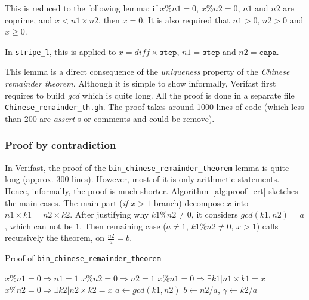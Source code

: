 \documentclass[oneside]{article}
\begin{document}
This is reduced to the following lemma: if $x\%n1 = 0$, $x\%n2 = 0$, $n1$ and $n2$ are coprime, and $x < n1 \times n2$, then $x = 0$. It is also required that $n1 > 0$, $n2 > 0$ and $x \geq 0$.

In \texttt{stripe\_l}, this is applied to $x = diff\times \mathtt{step}$, $n1 = \mathtt{step}$ and $n2 = \mathtt{capa}$.

This lemma is a direct consequence of the \emph{uniqueness} property of the \emph{Chinese remainder theorem}. Although it is simple to show informally, Verifast first requires to build \emph{gcd} which is quite long. All the proof is done in a separate file \texttt{Chinese\_remainder\_th.gh}. The proof takes around 1000 lines of code (which less than 200 are \emph{assert}-s or comments and could be remove).

\subsubsection{Proof by contradiction}
In Verifast, the proof of the \texttt{bin\_chinese\_remainder\_theorem} lemma is quite long (approx. 300 lines). However, most of it is only arithmetic statements. Hence, informally, the proof is much shorter. Algorithm~\ref{alg:proof_crt} sketches the main cases. The main part (\emph{if $x > 1$} branch) decompose $x$ into $n1\times k1 = n2\times k2$. After justifying why $k1\%n2 \neq 0$, it considers $gcd(k1, n2) = a$, which can not be $1$. Then remaining case ($a \neq 1$, $k1\%n2 \neq 0$, $x > 1$) calls recursively the theorem, on $\frac{n2}{a} = b$.
\begin{algorithm}
	\caption{Proof of \texttt{bin\_chinese\_remainder\_theorem}\label{alg:proof_crt}}
	{
		$x\%n1 = 0 \Rightarrow n1 = 1$\;
		$x\%n2 = 0 \Rightarrow n2 = 1$\;
		\;
		\;
		\Contradiction\;
	}
	{
		$x\%n1 = 0 \Rightarrow \exists k1 | n1\times k1 = x$ \;
		$x\%n2 = 0 \Rightarrow \exists k2 | n2\times k2 = x$ \;
		\;
		{
			$a \longleftarrow gcd(k1, n2)$\;
			$b \longleftarrow n2/a$, \;
			$\gamma \longleftarrow k2/a$\;
			\;
		}
	}
\end{algorithm}
\end{document}
